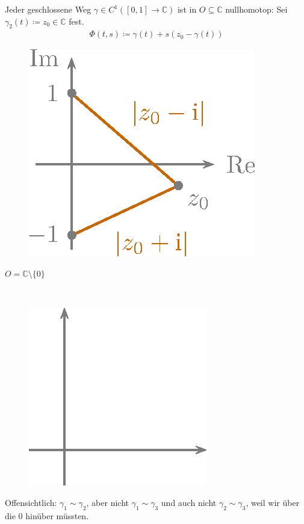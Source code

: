 \documentclass[a4paper,10pt]{scrbook}
\begin{document}
\begin{example}
\begin{enum-arab}
\begin{enum-alph}
      \item Jeder geschlossene Weg $\gamma \in C^1([0,1] \to \mathbb{C})$ ist in $O \subseteq \mathbb{C}$ nullhomotop: Sei $\gamma_2(t) \coloneq z_0 \in \mathbb{C}$ fest.
      \begin{align*}
        \Phi(t,s) \coloneq \gamma(t) + s (z_0 - \gamma(t))
      \end{align*}
      \begin{figure}[H]
        \centering
        \includegraphics[scale=0.2]{images/ana3-tmp-9}
      \end{figure}
    \end{enum-alph}

    \item $O = \mathbb{C} \setminus \{ 0 \}$
    \begin{enum-alph}
      \item ~
      \begin{figure}[H]
        \centering
        \includegraphics[scale=0.2]{images/ana3-tmp-10}
      \end{figure}
      Offensichtlich: $\gamma_1 \sim \gamma_2$, aber nicht $\gamma_1 \sim \gamma_3$ und auch nicht $\gamma_2 \sim \gamma_3$, weil wir über die $0$ hinüber müssten.


\end{enum-alph}
\end{enum-arab}
\end{example}
\end{document}

